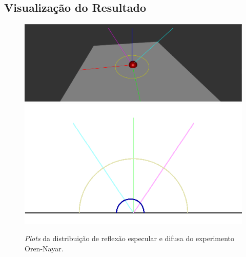 \subsection{Visualização do Resultado}
\begin{figure}[H]
    \caption{\small{\textit{Plots} da distribuição de reflexão especular e difusa do experimento Oren-Nayar.}}
    \label{fig-oren-nayar-plots}
    \vspace{42px}
  \includegraphics[width=\linewidth]{./Imagens/brdfs/oren-nayar-3D-plot}
\endminipage\hfill
{}
  \includegraphics[width=\linewidth]{./Imagens/brdfs/oren-nayar-polar-plot.png}
\endminipage\hfill
\end{figure}

